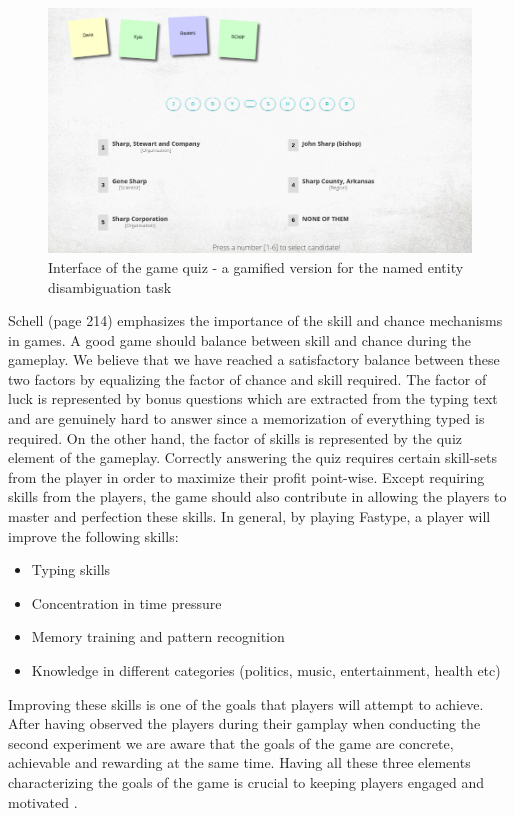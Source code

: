 \begin{figure}[]
    \centering
    \includegraphics[width=.6\linewidth]{figures/experiment2/game-quiz.png}
    \caption{Interface of the game quiz - a gamified version for the named entity disambiguation task}
    \label{fig:game-quiz}
\end{figure}

Schell \cite{51} (page 214) emphasizes the importance of the skill and chance mechanisms in games. A good game should balance between skill and chance during the gameplay. We believe that we have reached a satisfactory balance between these two factors by equalizing the factor of chance and skill required. The factor of luck is represented by bonus questions which are extracted from the typing text and are genuinely hard to answer since a memorization of everything typed is required. On the other hand, the factor of skills is represented by the quiz element of the gameplay. Correctly answering the quiz requires certain skill-sets from the player in order to maximize their profit point-wise. Except requiring skills from the players, the game should also contribute in allowing the players to master and perfection these skills. In general, by playing Fastype, a player will improve the following skills:

\begin{itemize}
    \item Typing skills
    \item Concentration in time pressure 
    \item Memory training and pattern recognition
    \item Knowledge in different categories (politics, music, entertainment, health etc)
\end{itemize}

Improving these skills is one of the goals that players will attempt to achieve. After having observed the players during their gamplay when conducting the second experiment we are aware that the goals of the game are concrete, achievable and rewarding at the same time. Having all these three elements characterizing the goals of the game is crucial to keeping players engaged and motivated \cite{51}. 

